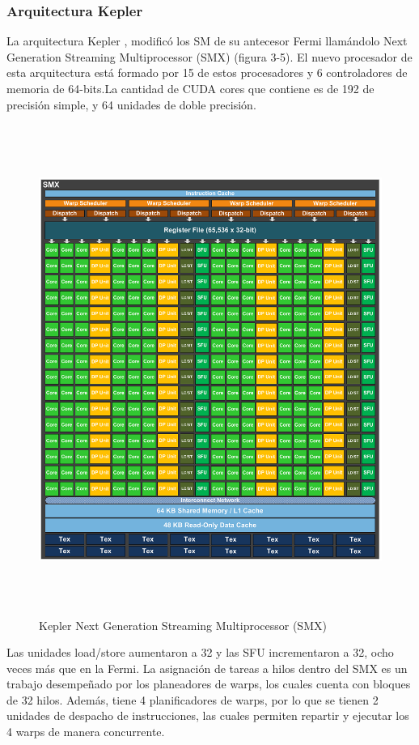 \subsubsection{Arquitectura Kepler}
La arquitectura Kepler \cite{Kepler}, modificó los SM de su antecesor Fermi llamándolo Next Generation Streaming Multiprocessor (SMX) (figura 3-5). El nuevo procesador de esta arquitectura está formado por 15 de estos procesadores y 6 controladores de memoria de 64-bits.La cantidad de CUDA cores que contiene es de 192 de precisión simple, y 64 unidades de doble precisión.\\
\begin{figure}[H]
                      \centering
                              \includegraphics[height=16cm]{img/KeplerSMX.png}
                      \caption{Kepler Next Generation Streaming Multiprocessor (SMX) \cite{Kepler}}
\end{figure}
Las unidades load/store aumentaron a 32 y las SFU incrementaron a 32, ocho veces más que en la Fermi. La asignación de tareas a hilos dentro del SMX es un trabajo desempeñado por los planeadores de warps, los cuales cuenta con bloques de 32 hilos. Además, tiene 4 planificadores de warps, por lo que se tienen 2 unidades de despacho de instrucciones, las cuales permiten  repartir y ejecutar los 4 warps de manera concurrente.\\
